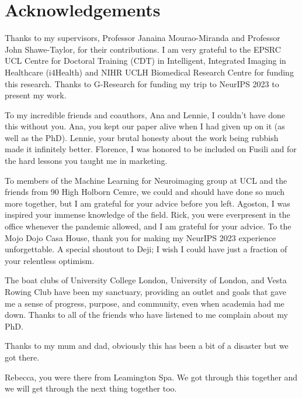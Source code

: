 \chapter*{Acknowledgements}

Thanks to my supervisors, Professor Janaina Mourao-Miranda and Professor John Shawe-Taylor, for their contributions. 
I am very grateful to the EPSRC UCL Centre for Doctoral Training (CDT) in Intelligent, Integrated Imaging in Healthcare (i4Health) and NIHR UCLH Biomedical
Research Centre for funding this research.
Thanks to G-Research for funding my trip to NeurIPS 2023 to present my work.

To my incredible friends and coauthors, Ana and Lennie, I couldn't have done this without you. Ana, you kept our paper alive when I had given up on it (as well as the PhD). Lennie, your brutal honesty about the work being rubbish made it infinitely better. Florence, I was honored to be included on Fusili and for the hard lessons you taught me in marketing.

To members of the Machine Learning for Neuroimaging group at UCL and the friends from 90 High Holborn
Cemre, we could and should have done so much more together, but I am grateful for your advice before you left. 
Agoston, I was inspired your immense knowledge of the field.
Rick, you were everpresent in the office whenever the pandemic allowed, and I am grateful for your advice.
To the Mojo Dojo Casa House, thank you for making my NeurIPS 2023 experience unforgettable. A special shoutout to Deji; I wish I could have just a fraction of your relentless optimism.

The boat clubs of University College London, University of London, and Vesta Rowing Club have been my sanctuary, providing an outlet and goals that gave me a sense of progress, purpose, and community, even when academia had me down. Thanks to all of the friends who have listened to me complain about my PhD.

Thanks to my mum and dad, obviously this has been a bit of a disaster but we got there. 

Rebecca, you were there from Leamington Spa. We got through this together and we will get through the next thing together too.

